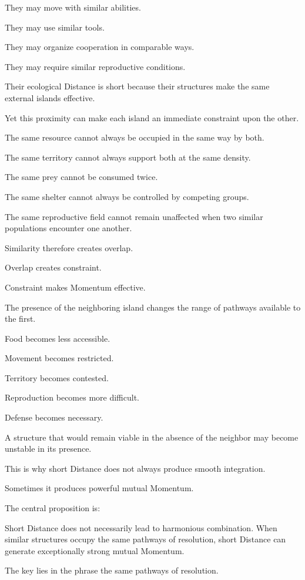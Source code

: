 They may move with similar abilities.

They may use similar tools.

They may organize cooperation in comparable ways.

They may require similar reproductive conditions.

Their ecological Distance is short because their structures make the same external islands effective.

Yet this proximity can make each island an immediate constraint upon the other.

The same resource cannot always be occupied in the same way by both.

The same territory cannot always support both at the same density.

The same prey cannot be consumed twice.

The same shelter cannot always be controlled by competing groups.

The same reproductive field cannot remain unaffected when two similar populations encounter one another.

Similarity therefore creates overlap.

Overlap creates constraint.

Constraint makes Momentum effective.

The presence of the neighboring island changes the range of pathways available to the first.

Food becomes less accessible.

Movement becomes restricted.

Territory becomes contested.

Reproduction becomes more difficult.

Defense becomes necessary.

A structure that would remain viable in the absence of the neighbor may become unstable in its presence.

This is why short Distance does not always produce smooth integration.

Sometimes it produces powerful mutual Momentum.

The central proposition is:

Short Distance does not necessarily lead to harmonious combination. When similar structures occupy the same pathways of resolution, short Distance can generate exceptionally strong mutual Momentum.

The key lies in the phrase the same pathways of resolution.

